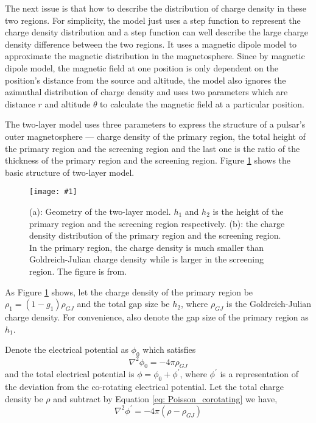\documentclass[12pt]{report}
\newcommand{\singleFig}[3]{
  \begin{figure}[!htp]
    \centering
    \texttt{[image: \#1]}
    \caption{#3}
    \label{fig: #1}
  \end{figure}
}
\newcommand{\myComment}[1]{
  \newline
}
\begin{document}
    The next issue is that how to describe the distribution of charge density in these two 
    regions. For simplicity, the model just uses a step function to represent the charge 
    density distribution and a step function can well describe the large charge density 
    difference between the two regions. It uses a magnetic dipole model to approximate the 
    magnetic distribution in the magnetosphere. Since by magnetic dipole model, the magnetic 
    field at one position is only dependent on the position's distance from the source 
    and altitude, the model also ignores the azimuthal distribution of charge density 
    and uses two parameters which are distance $r$ and altitude $\theta$ to calculate the 
    magnetic field at a particular position.

    The two-layer model uses three parameters to express the structure of a pulsar's outer 
    magnetosphere --- charge density of the primary region, the total height of the primary 
    region and the screening region and the last one is the ratio of the thickness of the 
    primary region and the screening region. Figure \ref{fig: charge_density} shows the 
    basic structure of two-layer model. 

    \singleFig{charge_density}{0.6}{(a): Geometry of the two-layer model. $h_{1}$ and 
      $h_{2}$ is the height of the primary region and the screening region respectively. 
      (b): the charge density distribution of the primary region and the screening region. 
      In the primary region, the charge density is much smaller than Goldreich-Julian charge 
      density while is larger in the screening region. The figure is from. 
      \citep{0004-637X-720-1-178}}

    As Figure \ref{fig: charge_density} shows, 
    let the charge density of the primary region be $\rho_1 = (1-g_{1}) \rho_{GJ}$ and 
    the total gap size be
    $h_{2}$, where $\rho_{GJ}$ is the Goldreich-Julian charge density. For convenience, 
    also denote the gap size of the primary region as $h_{1}$. 
    \myComment{Then we can calculate electric potential and electric field by solving the 
    Poisson equation }
    Denote the electrical potential as $\phi_{0}$ which satisfies 
    \begin{equation}
      \label{eq: Poisson_corotating}
      \nabla^{2}\phi_{0} = -4\pi\rho_{GJ}
    \end{equation}
    and the total electrical potential is $\phi = \phi_{0} + \phi^{\prime}$, 
    where $\phi^{\prime}$ is a representation of the deviation from the co-rotating 
    electrical potential. Let the total charge density be $\rho$ and subtract by
    Equation \ref{eq: Poisson_corotating} we have,
    \begin{equation}
      \label{eq: Poisson_final}
      \nabla^{2}\phi^{\prime} = -4\pi\left(\rho - \rho_{GJ} \right)
    \end{equation}
\end{document}
